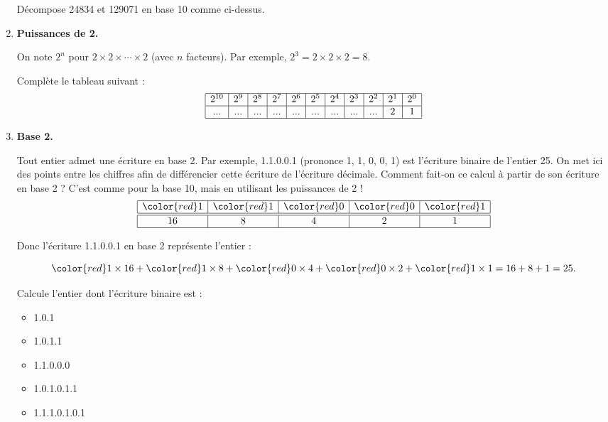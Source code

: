 \documentclass[class=report,crop=false, 12pt]{standalone}
\begin{document}
\begin{activite}
\begin{enumerate}
    Décompose 24834 et  129071 en base 10 comme ci-dessus.
  
  \item \textbf{Puissances de 2.}


    On note $2^n$ pour $2 \times 2 \times \cdots \times 2$ (avec $n$ facteurs). Par exemple, $2^3 = 2 \times 2 \times 2 = 8$. 

    Complète le tableau suivant :
$$
\begin{array}{|c|c|c|c|c|c|c|c|c|c|c|}
  \hline
  2^{10} &  2^9 & 2^8 & 2^7 & 2^6 & 2^5 & 2^4 & 2^3 & 2^2 & 2^1 & 2^0 \\
  \hline
  ... & ... & ... & ... & ... & ... & ... & ... & ... & 2 & 1 \\ 
  \hline
\end{array}
$$
    
  \item \textbf{Base 2.}
  
    Tout entier admet une écriture en base 2. Par exemple, 1.1.0.0.1 (prononce 1, 1, 0, 0, 1) est l'écriture binaire de l'entier 25. On met ici des points entre les chiffres afin de différencier cette écriture de l'écriture décimale. Comment fait-on ce calcul à partir de son écriture en base 2 ? C'est comme pour la base 10, mais en utilisant les puissances de 2 ! 
$$
\begin{array}{|c|c|c|c|c|}
  \hline
  {\color{red}1} & {\color{red}1} & {\color{red}0} & {\color{red}0} & {\color{red}1} \\ 
  \hline\hline
  16  & 8 & 4 & 2 & 1 \\
  \hline
\end{array}
$$


    Donc l'écriture {\color{red}1}.{\color{red}1}.{\color{red}0}.{\color{red}0}.{\color{red}1} en base 2 représente l'entier : 

    $${\color{red}1} \times 16 + {\color{red}1} \times 8 + {\color{red}0} \times 4 + {\color{red}0} \times 2 + {\color{red}1} \times 1 = 16 + 8 + 1 = 25.$$

    Calcule l'entier dont l'écriture binaire est :
 \begin{itemize}
  \item 1.0.1
  \item 1.0.1.1 
  \item 1.1.0.0.0 
  \item 1.0.1.0.1.1
  \item 1.1.1.0.1.0.1 
\end{itemize}   
 
\end{enumerate}

\end{activite}
\end{document}

